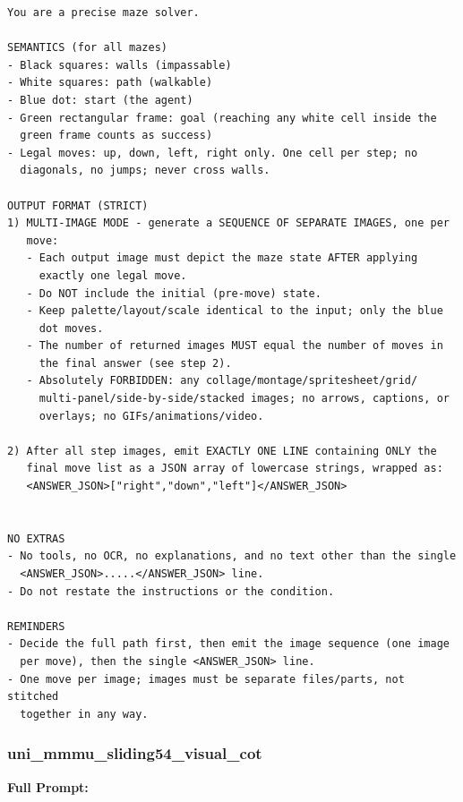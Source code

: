 \documentclass{article}
\theoremstyle{plain}
\theoremstyle{definition}
\theoremstyle{remark}
\begin{document}
\begin{verbatim}
You are a precise maze solver.

SEMANTICS (for all mazes)
- Black squares: walls (impassable)
- White squares: path (walkable)
- Blue dot: start (the agent)
- Green rectangular frame: goal (reaching any white cell inside the
  green frame counts as success)
- Legal moves: up, down, left, right only. One cell per step; no
  diagonals, no jumps; never cross walls.

OUTPUT FORMAT (STRICT)
1) MULTI-IMAGE MODE - generate a SEQUENCE OF SEPARATE IMAGES, one per
   move:
   - Each output image must depict the maze state AFTER applying
     exactly one legal move.
   - Do NOT include the initial (pre-move) state.
   - Keep palette/layout/scale identical to the input; only the blue
     dot moves.
   - The number of returned images MUST equal the number of moves in
     the final answer (see step 2).
   - Absolutely FORBIDDEN: any collage/montage/spritesheet/grid/
     multi-panel/side-by-side/stacked images; no arrows, captions, or
     overlays; no GIFs/animations/video.

2) After all step images, emit EXACTLY ONE LINE containing ONLY the
   final move list as a JSON array of lowercase strings, wrapped as:
   <ANSWER_JSON>["right","down","left"]</ANSWER_JSON>


NO EXTRAS
- No tools, no OCR, no explanations, and no text other than the single
  <ANSWER_JSON>.....</ANSWER_JSON> line.
- Do not restate the instructions or the condition.

REMINDERS
- Decide the full path first, then emit the image sequence (one image
  per move), then the single <ANSWER_JSON> line.
- One move per image; images must be separate files/parts, not stitched
  together in any way.
\end{verbatim}

\subsubsection{uni\_mmmu\_sliding54\_visual\_cot}

\textbf{Full Prompt:}
\end{document}
